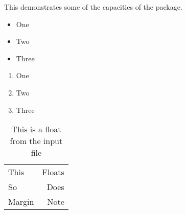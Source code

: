 This demonstrates some of the capacities of the package.

\begin{itemize}
\item One
\item Two
\item Three
\end{itemize}
\vspace{5cm}
\begin{enumerate}
\item One
\item Two
\item Three
\end{enumerate}

\begin{table}
  \centering
  \begin{tabular}{lr}
    This & Floats \\
    So & Does \\
    Margin & Note
  \end{tabular}
  \caption{This is a float from the input file}
\end{table}

